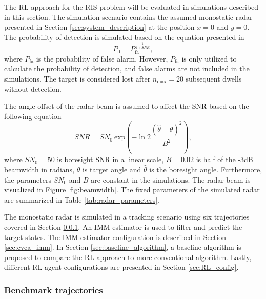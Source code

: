 \documentclass[english, 12pt, a4paper, elec, utf8, a-1b, online]{aaltothesis}
\newcommand{\sno}{SN_0}
\renewcommand{\exp}[1]{\text{exp}\left( #1 \right)}
\newcommand{\nmax}{n_\text{max}}
\begin{document}
The RL approach for the RIS problem will be evaluated in simulations described in this section.
The simulation scenario contains the assumed monostatic radar presented in Section \ref{sec:system_description} at the position $x=0$ and $y=0$. 
The probability of detection is simulated based on the equation presented in \cite{vanKeuk1993}
\begin{equation}\label{eq:singer_1_pd}
    P_\text{d} = P_\text{fa}^{\frac{1}{1+SNR}},
\end{equation}
where $P_\text{fa}$ is the probability of false alarm.
However, $P_\text{fa}$ is only utilized to calculate the probability of detection, and false alarms are not included in the simulations.
The target is considered lost after $\nmax=20$ subsequent dwells without detection.

The angle offset of the radar beam is assumed to affect the SNR based on the following equation
\begin{equation} \label{eq:offset_snr}
    SNR = \sno~\exp{ - \ln{2}
        \frac
            {(\hat{\theta} - \theta)^2}
            {B^2}},
\end{equation}
where $\sno=50$ is boresight SNR in a linear scale, $B=0.02$ is half of the -3dB beamwidth in radians, $\theta$ is target angle and $\hat{\theta} $ is the boresight angle. 
Furthermore, the parameters $\sno$ and $B$ are constant in the simulations. 
The radar beam is visualized in Figure \ref{fig:beamwidth}.
The fixed parameters of the simulated radar are summarized in Table \ref{tab:radar_parameters}.

The monostatic radar is simulated in a tracking scenario using six trajectories covered in Section \ref{sec:benchmark_trajectories}.
An IMM estimator is used to filter and predict the target states. 
The IMM estimator configuration is described in Section \ref{sec:cvca_imm}.
In Section \ref{sec:baseline_algorithm}, a baseline algorithm is proposed to compare the RL approach to more conventional algorithm.
Lastly, different RL agent configurations are presented in Section \ref{sec:RL_config}.


\subsubsection{Benchmark trajectories} \label{sec:benchmark_trajectories}
\end{document}
